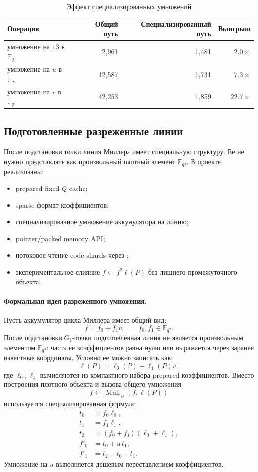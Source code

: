 \documentclass[12pt,a4paper]{article}
\newcommand{\Fq}{\mathbb{F}_q}
\newcommand{\code}[1]{\texttt{\detokenize{#1}}}
\begin{document}
\begin{table}[htbp]
\centering
\caption{Эффект специализированных умножений}
\small
\begin{tabular}{l r r r}
\toprule
Операция & Общий путь & Специализированный путь & Выигрыш \\
\midrule
умножение на $13$ в $\Fq$ & 2,961 & 1,481 & $2.0\times$ \\
умножение на $u$ в $\mathbb{F}_{q^2}$ & 12,587 & 1,731 & $7.3\times$ \\
умножение на $v$ в $\mathbb{F}_{q^4}$ & 42,253 & 1,859 & $22.7\times$ \\
\bottomrule
\end{tabular}
\end{table}

\subsection{Подготовленные разреженные линии}

После подстановки точки линия Миллера имеет специальную структуру. Ее не нужно
представлять как произвольный плотный элемент $\mathbb{F}_{q^4}$. В проекте
реализованы:
\begin{itemize}
    \item prepared fixed-$Q$ cache;
    \item sparse-формат коэффициентов;
    \item специализированное умножение аккумулятора на линию;
    \item pointer/packed memory API;
    \item потоковое чтение code-shards через \code{EXTCODECOPY};
    \item экспериментальное слияние $f\leftarrow f^2\ell(P)$ без лишнего
    промежуточного объекта.
\end{itemize}

\paragraph{Формальная идея разреженного умножения.}
Пусть аккумулятор цикла Миллера имеет общий вид:
\[
    f=f_0+f_1v,\qquad f_0,f_1\in\mathbb{F}_{q^2}.
\]
После подстановки $G_1$-точки подготовленная линия не является произвольным
элементом $\mathbb{F}_{q^4}$: часть ее коэффициентов равна нулю или выражается
через заранее известные координаты. Условно ее можно записать как:
\[
    \ell(P)=\ell_0(P)+\ell_1(P)v,
\]
где $\ell_0,\ell_1$ вычисляются из компактного набора prepared-коэффициентов.
Вместо построения плотного объекта и вызова общего умножения
\[
    f\leftarrow\operatorname{Mul}_{\mathbb{F}_{q^4}}(f,\ell(P))
\]
используется специализированная формула:
\[
\begin{aligned}
    t_0&=f_0\ell_0,\\
    t_1&=f_1\ell_1,\\
    t_2&=(f_0+f_1)(\ell_0+\ell_1),\\
    f'_0&=t_0+u\,t_1,\\
    f'_1&=t_2-t_0-t_1.
\end{aligned}
\]
Умножение на $u$ выполняется дешевым переставлением коэффициентов. 
\end{document}
